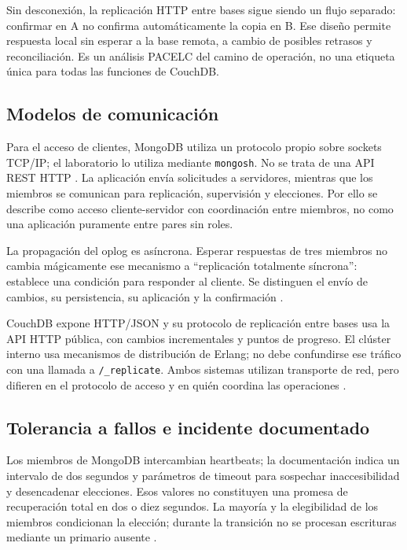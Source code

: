 Sin desconexión, la replicación HTTP entre bases sigue siendo un flujo separado: confirmar en A no confirma automáticamente la copia en B. Ese diseño permite respuesta local sin esperar a la base remota, a cambio de posibles retrasos y reconciliación. Es un análisis PACELC del camino de operación, no una etiqueta única para todas las funciones de CouchDB.

\subsection{Modelos de comunicación}
Para el acceso de clientes, MongoDB utiliza un protocolo propio sobre sockets TCP/IP; el laboratorio lo utiliza mediante \texttt{mongosh}. No se trata de una API REST HTTP \cite{MongoWire}. La aplicación envía solicitudes a servidores, mientras que los miembros se comunican para replicación, supervisión y elecciones. Por ello se describe como acceso cliente-servidor con coordinación entre miembros, no como una aplicación puramente entre pares sin roles.

La propagación del oplog es asíncrona. Esperar respuestas de tres miembros no cambia mágicamente ese mecanismo a ``replicación totalmente síncrona'': establece una condición para responder al cliente. Se distinguen el envío de cambios, su persistencia, su aplicación y la confirmación \cite{MongoReplication,MongoWriteConcern}.

CouchDB expone HTTP/JSON y su protocolo de replicación entre bases usa la API HTTP pública, con cambios incrementales y puntos de progreso. El clúster interno usa mecanismos de distribución de Erlang; no debe confundirse ese tráfico con una llamada a \texttt{/\_replicate}. Ambos sistemas utilizan transporte de red, pero difieren en el protocolo de acceso y en quién coordina las operaciones \cite{CouchReplication,CouchSetup}.

\subsection{Tolerancia a fallos e incidente documentado}
Los miembros de MongoDB intercambian heartbeats; la documentación indica un intervalo de dos segundos y parámetros de timeout para sospechar inaccesibilidad y desencadenar elecciones. Esos valores no constituyen una promesa de recuperación total en dos o diez segundos. La mayoría y la elegibilidad de los miembros condicionan la elección; durante la transición no se procesan escrituras mediante un primario ausente \cite{MongoElections}.

